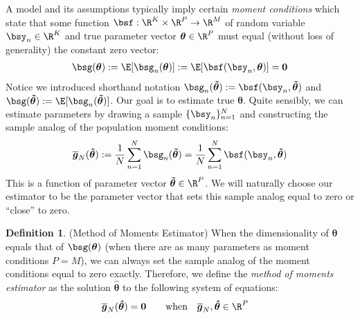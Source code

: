 \documentclass[12pt]{article}
\theoremstyle{plain}
\theoremstyle{definition}
\newtheorem{defn}[thm]{Definition}
\theoremstyle{remark}
\newcommand{\ra}{\rightarrow}
\newcommand{\bstheta}{\boldsymbol{\theta}}
\newcommand{\bshattheta}{\boldsymbol{\hat{\theta}}}
\newcommand{\bstildetheta}{\boldsymbol{\tilde{\theta}}}
\newcommand{\bsbarg}{\boldsymbol{\overline{g}}}
\renewcommand{\bso}{\boldsymbol{0}}
\newcommand{\sumnN}{\sum^N_{n=1}}
\newcommand{\nN}{_{n=1}^N}
\begin{document}
A model and its assumptions typically imply certain \emph{moment
conditions} which state that some function
$\bsf:\R^K\times\R^P \ra \R^M$ of random variable $\bsy_n\in\R^K$ and
true parameter vector
$\bstheta \in\R^P$ must equal (without loss of generality) the constant
zero vector:
\begin{align}
  \label{populationMomentConditions}
  \bsg(\bstheta) := \E[\bsg_n(\bstheta) ]
  := \E[\bsf(\bsy_n,\bstheta)] = \bso
\end{align}
Notice we introduced shorthand notation
$\bsg_n(\bstildetheta):=\bsf(\bsy_n,\bstildetheta)$
and $\bsg(\bstildetheta):=\E[\bsg_n(\bstildetheta)]$.
Our goal is to estimate true $\bstheta$. Quite sensibly, we can estimate
parameters by drawing a sample $\{\bsy_n\}\nN$ and constructing the
sample analog of the population moment conditions:
\begin{align}
  \label{sampleMomentConditions}
  \bsbarg_N(\bstildetheta) :=
  \frac{1}{N} \sumnN \bsg_n(\bstildetheta)
  =
  \frac{1}{N} \sumnN \bsf(\bsy_n,\bstildetheta)
\end{align}
This is a function of parameter vector $\bstildetheta\in\R^P$. We will
naturally choose our estimator to be the parameter vector that sets this
sample analog equal to zero or ``close'' to zero.

\begin{defn}(Method of Moments Estimator)
When the dimensionality of $\bstheta$ equals that of $\bsg(\bstheta)$
(when there are as many parameters as moment conditions $P=M$), we can
always set the sample analog of the moment conditions equal to zero
exactly. Therefore, we define the \emph{method of moments estimator} as
the solution $\bshattheta$ to the following system of
equations:
\begin{align*}
  \bsbarg_N(\bshattheta) &= \bso
  \qquad\text{when}\quad
  \bsbarg_N,\bshattheta \in\R^P
\end{align*}
\end{defn}
\end{document}
